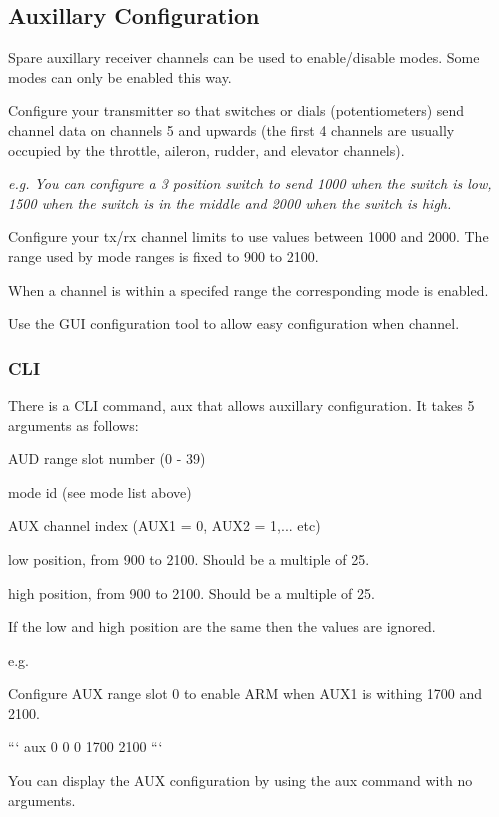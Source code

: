\subsection*{Auxillary Configuration}

Spare auxillary receiver channels can be used to enable/disable modes. Some modes can only be enabled this way.

Configure your transmitter so that switches or dials (potentiometers) send channel data on channels 5 and upwards (the first 4 channels are usually occupied by the throttle, aileron, rudder, and elevator channels).

{\itshape e.\+g. You can configure a 3 position switch to send 1000 when the switch is low, 1500 when the switch is in the middle and 2000 when the switch is high.}

Configure your tx/rx channel limits to use values between 1000 and 2000. The range used by mode ranges is fixed to 900 to 2100.

When a channel is within a specifed range the corresponding mode is enabled.

Use the G\+U\+I configuration tool to allow easy configuration when channel.

\subsubsection*{C\+L\+I}

There is a C\+L\+I command, {\ttfamily aux} that allows auxillary configuration. It takes 5 arguments as follows\+:


\begin{DoxyItemize}
\item A\+U\+D range slot number (0 -\/ 39)
\item mode id (see mode list above)
\item A\+U\+X channel index (A\+U\+X1 = 0, A\+U\+X2 = 1,... etc)
\item low position, from 900 to 2100. Should be a multiple of 25.
\item high position, from 900 to 2100. Should be a multiple of 25.
\end{DoxyItemize}

If the low and high position are the same then the values are ignored.

e.\+g.

Configure A\+U\+X range slot 0 to enable A\+R\+M when A\+U\+X1 is withing 1700 and 2100.

``` aux 0 0 0 1700 2100 ```

You can display the A\+U\+X configuration by using the {\ttfamily aux} command with no arguments. 